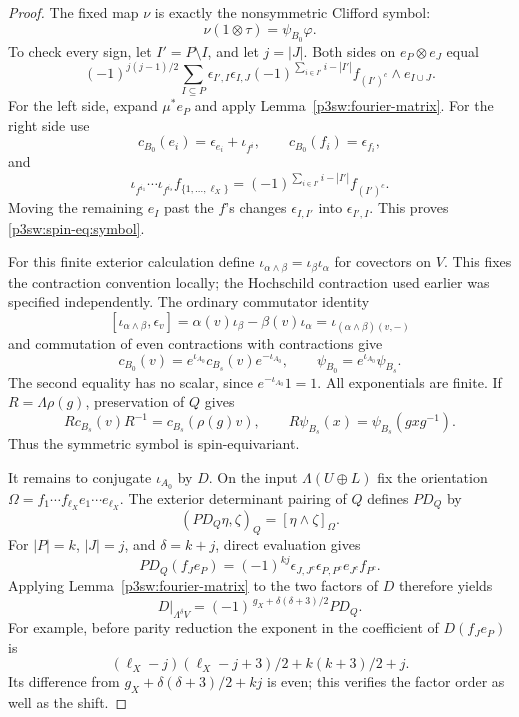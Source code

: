 \documentclass[11pt]{article}
\numberwithin{equation}{section}
\begin{document}
\begin{proof}
The fixed map \(\nu\) is exactly the nonsymmetric Clifford symbol:
\begin{equation}
\label{p3sw:spin-eq:symbol}
 \nu(1\otimes\tau)=\psi_{B_0}\varphi .
\end{equation}
To check every sign, let \(I'=P\setminus I\), and let \(j=|J|\).
Both sides on \(e_P\otimes e_J\) equal
\begin{equation}
\label{p3sw:spin-eq:symbol-basis}
 (-1)^{j(j-1)/2}
 \sum_{I\subseteq P}
   \epsilon_{I',I}\epsilon_{I,J}
   (-1)^{\sum_{i\in I'}i-|I'|}
   f_{(I')^c}\wedge e_{I\cup J}.
\end{equation}
For the left side, expand \(\mu^*e_P\) and apply
Lemma~\ref{p3sw:fourier-matrix}.  For the right side use
\[
 c_{B_0}(e_i)=\epsilon_{e_i}+\iota_{f^i},\qquad
 c_{B_0}(f_i)=\epsilon_{f_i},
\]
and
\[
 \iota_{f^{i_1}}\cdots\iota_{f^{i_s}}f_{\{1,\ldots,\ell_X\}}
       =(-1)^{\sum_{i\in I'}i-|I'|}f_{(I')^c}.
\]
Moving the remaining \(e_I\) past the \(f\)'s changes
\(\epsilon_{I,I'}\) into \(\epsilon_{I',I}\).  This proves
\eqref{p3sw:spin-eq:symbol}.

For this finite exterior calculation define
\(\iota_{\alpha\wedge\beta}=\iota_\beta\iota_\alpha\) for covectors
on \(V\).  This fixes the contraction convention locally; the
Hochschild contraction used earlier was specified independently.
The ordinary commutator identity
\[
 [\iota_{\alpha\wedge\beta},\epsilon_v]
   =\alpha(v)\iota_\beta-\beta(v)\iota_\alpha
   =\iota_{(\alpha\wedge\beta)(v,-)}
\]
and commutation of even contractions with contractions give
\[
 c_{B_0}(v)=e^{\iota_{A_0}}c_{B_s}(v)e^{-\iota_{A_0}},
 \qquad
 \psi_{B_0}=e^{\iota_{A_0}}\psi_{B_s}.
\]
The second equality has no scalar, since
\(e^{-\iota_{A_0}}1=1\).  All exponentials are finite.
If \(R=\Lambda\rho(g)\), preservation of \(Q\) gives
\[
 Rc_{B_s}(v)R^{-1}=c_{B_s}(\rho(g)v),
 \qquad
 R\psi_{B_s}(x)=\psi_{B_s}(gxg^{-1}).
\]
Thus the symmetric symbol is spin-equivariant.

It remains to conjugate \(\iota_{A_0}\) by \(D\).  On the input
\(\Lambda(U\oplus L)\) fix the orientation
\(\Omega=f_1\cdots f_{\ell_X} e_1\cdots e_{\ell_X}\).  The exterior determinant
pairing of \(Q\) defines \(PD_Q\) by
\[
 (PD_Q\eta,\zeta)_Q=[\eta\wedge\zeta]_\Omega.
\]
For \(|P|=k\), \(|J|=j\), and \(\delta=k+j\), direct evaluation gives
\[
 PD_Q(f_Je_P)=(-1)^{kj}\epsilon_{J,J^c}\epsilon_{P,P^c}
                      e_{J^c}f_{P^c}.
\]
Applying Lemma~\ref{p3sw:fourier-matrix} to the two factors of \(D\)
therefore yields
\begin{equation}
\label{p3sw:spin-eq:duality}
 D|_{\Lambda^\delta V}
      =(-1)^{\,g_X+\delta(\delta+3)/2}PD_Q .
\end{equation}
For example, before parity reduction the exponent in the coefficient
of \(D(f_Je_P)\) is
\[
 (\ell_X-j)(\ell_X-j+3)/2+k(k+3)/2+j.
\]
Its difference from \(g_X+\delta(\delta+3)/2+kj\) is even; this verifies
the factor order as well as the shift.


\end{proof}
\end{document}

